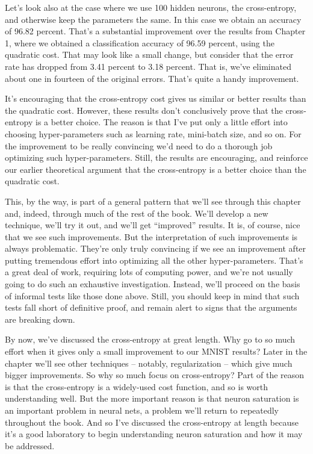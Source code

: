 \documentclass[a4paper,twoside,10pt]{book}
\begin{document}
Let's look also at the case where we use 100 hidden neurons, the cross-entropy, and otherwise keep the parameters the same. In this case we obtain an accuracy of 96.82 percent. That's a substantial improvement over the results from Chapter 1, where we obtained a classification accuracy of 96.59 percent, using the quadratic cost. That may look like a small change, but consider that the error rate has dropped from 3.41 percent to 3.18 percent. That is, we've eliminated about one in fourteen of the original errors. That's quite a handy improvement.
	
It's encouraging that the cross-entropy cost gives us similar or better results than the quadratic cost. However, these results don't conclusively prove that the cross-entropy is a better choice. The reason is that I've put only a little effort into choosing hyper-parameters such as learning rate, mini-batch size, and so on. For the improvement to be really convincing we'd need to do a thorough job optimizing such hyper-parameters. Still, the results are encouraging, and reinforce our earlier theoretical argument that the cross-entropy is a better choice than the quadratic cost.
	
This, by the way, is part of a general pattern that we'll see through this chapter and, indeed, through much of the rest of the book. We'll develop a new technique, we'll try it out, and we'll get ``improved'' results. It is, of course, nice that we see such improvements. But the interpretation of such improvements is always problematic. They're only truly convincing if we see an improvement after putting tremendous effort into optimizing all the other hyper-parameters. That's a great deal of work, requiring lots of computing power, and we're not usually going to do such an exhaustive investigation. Instead, we'll proceed on the basis of informal tests like those done above. Still, you should keep in mind that such tests fall short of definitive proof, and remain alert to signs that the arguments are breaking down.
	
By now, we've discussed the cross-entropy at great length. Why go to so much effort when it gives only a small improvement to our MNIST results? Later in the chapter we'll see other techniques -- notably, regularization -- which give much bigger improvements. So why so much focus on cross-entropy? Part of the reason is that the cross-entropy is a widely-used cost function, and so is worth understanding well. But the more important reason is that neuron saturation is an important problem in neural nets, a problem we'll return to repeatedly throughout the book. And so I've discussed the cross-entropy at length because it's a good laboratory to begin understanding neuron saturation and how it may be addressed.
\end{document}
